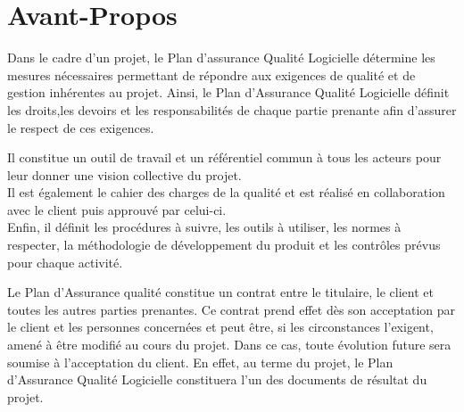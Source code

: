 \chapter*{Avant-Propos}

\setlength{\parindent}{1cm}
Dans le cadre d'un projet, le Plan d'assurance Qualité Logicielle détermine les mesures nécessaires permettant de répondre aux exigences de qualité et de gestion inhérentes au projet. 
Ainsi, le Plan d’Assurance Qualité Logicielle définit les droits,les devoirs et les responsabilités de chaque partie prenante afin d’assurer le respect de ces exigences. 

Il constitue un outil de travail et un référentiel commun à tous les acteurs pour leur donner une vision collective du projet. \\ 
Il est également le cahier des charges de la qualité et est réalisé en collaboration avec le client puis approuvé par celui-ci. \\
Enfin, il définit les procédures à suivre, les outils à utiliser, les normes à respecter, la méthodologie de développement du produit et les contrôles prévus pour
chaque activité.

Le Plan d'Assurance qualité constitue un contrat entre le titulaire, le client et toutes les autres parties prenantes. 
Ce contrat prend effet dès son acceptation par le client et les personnes concernées et peut être, si les circonstances l'exigent, amené à être modifié au cours du projet. Dans ce cas, toute évolution future sera soumise à l'acceptation du client. En effet, au terme du projet, le Plan d’Assurance Qualité Logicielle constituera l’un des documents de résultat du projet.
